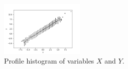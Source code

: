 \documentclass[BCOR=1mm, DIV=calc,10pt,
twoside=true,
twocolumn,
headings=normal]{scrartcl}
\begin{document}
\begin{figure}
\begin{center}
\includegraphics[width=4cm]{profile}
\caption{\label{fig:profile} Profile histogram of variables $X$ and $Y$.}
\end{center}
\end{figure}
\end{document}

